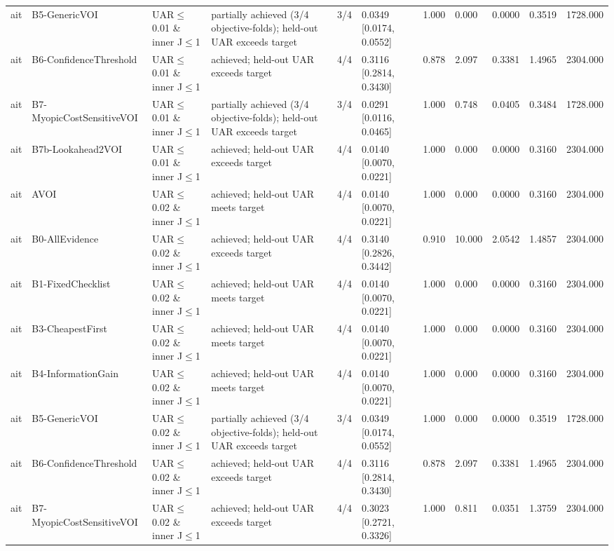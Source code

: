 \begin{table}[!ht]
{\begin{tabular}{lllllllllll}
ait & B5-GenericVOI & UAR$\le$0.01 \& inner J$\le$1 & partially achieved (3/4 objective-folds); held-out UAR exceeds target & 3/4 & 0.0349 [0.0174, 0.0552] & 1.000 & 0.000 & 0.0000 & 0.3519 & 1728.000 \\
ait & B6-ConfidenceThreshold & UAR$\le$0.01 \& inner J$\le$1 & achieved; held-out UAR exceeds target & 4/4 & 0.3116 [0.2814, 0.3430] & 0.878 & 2.097 & 0.3381 & 1.4965 & 2304.000 \\
ait & B7-MyopicCostSensitiveVOI & UAR$\le$0.01 \& inner J$\le$1 & partially achieved (3/4 objective-folds); held-out UAR exceeds target & 3/4 & 0.0291 [0.0116, 0.0465] & 1.000 & 0.748 & 0.0405 & 0.3484 & 1728.000 \\
ait & B7b-Lookahead2VOI & UAR$\le$0.01 \& inner J$\le$1 & achieved; held-out UAR exceeds target & 4/4 & 0.0140 [0.0070, 0.0221] & 1.000 & 0.000 & 0.0000 & 0.3160 & 2304.000 \\
ait & AVOI & UAR$\le$0.02 \& inner J$\le$1 & achieved; held-out UAR meets target & 4/4 & 0.0140 [0.0070, 0.0221] & 1.000 & 0.000 & 0.0000 & 0.3160 & 2304.000 \\
ait & B0-AllEvidence & UAR$\le$0.02 \& inner J$\le$1 & achieved; held-out UAR exceeds target & 4/4 & 0.3140 [0.2826, 0.3442] & 0.910 & 10.000 & 2.0542 & 1.4857 & 2304.000 \\
ait & B1-FixedChecklist & UAR$\le$0.02 \& inner J$\le$1 & achieved; held-out UAR meets target & 4/4 & 0.0140 [0.0070, 0.0221] & 1.000 & 0.000 & 0.0000 & 0.3160 & 2304.000 \\
ait & B3-CheapestFirst & UAR$\le$0.02 \& inner J$\le$1 & achieved; held-out UAR meets target & 4/4 & 0.0140 [0.0070, 0.0221] & 1.000 & 0.000 & 0.0000 & 0.3160 & 2304.000 \\
ait & B4-InformationGain & UAR$\le$0.02 \& inner J$\le$1 & achieved; held-out UAR meets target & 4/4 & 0.0140 [0.0070, 0.0221] & 1.000 & 0.000 & 0.0000 & 0.3160 & 2304.000 \\
ait & B5-GenericVOI & UAR$\le$0.02 \& inner J$\le$1 & partially achieved (3/4 objective-folds); held-out UAR exceeds target & 3/4 & 0.0349 [0.0174, 0.0552] & 1.000 & 0.000 & 0.0000 & 0.3519 & 1728.000 \\
ait & B6-ConfidenceThreshold & UAR$\le$0.02 \& inner J$\le$1 & achieved; held-out UAR exceeds target & 4/4 & 0.3116 [0.2814, 0.3430] & 0.878 & 2.097 & 0.3381 & 1.4965 & 2304.000 \\
ait & B7-MyopicCostSensitiveVOI & UAR$\le$0.02 \& inner J$\le$1 & achieved; held-out UAR exceeds target & 4/4 & 0.3023 [0.2721, 0.3326] & 1.000 & 0.811 & 0.0351 & 1.3759 & 2304.000 \\

\end{tabular}}
\end{table}
